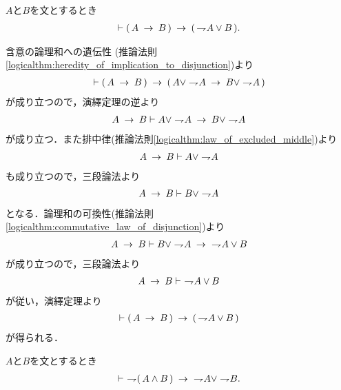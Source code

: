 	\begin{screen}
		\begin{logicalthm}[含意は否定と論理和で表せる]
		\label{logicalthm:implication_rewritable_by_disjunction_of_negation}
			$A$と$B$を文とするとき
			\begin{align}
				\vdash (\, A \rarrow B\, ) \rarrow (\, \negation A \vee B\, ).
			\end{align}
		\end{logicalthm}
	\end{screen}
	
	\begin{prf}
		含意の論理和への遺伝性
		(推論法則\ref{logicalthm:heredity_of_implication_to_disjunction})より
		\begin{align}
			\vdash (\, A \rarrow B\, ) 
			\rarrow (\, A \vee \negation A \rarrow B \vee \negation A\, )
		\end{align}
		が成り立つので，演繹定理の逆より
		\begin{align}
			A \rarrow B \vdash A \vee \negation A \rarrow B \vee \negation A
		\end{align}
		が成り立つ．また排中律(推論法則\ref{logicalthm:law_of_excluded_middle})より
		\begin{align}
			A \rarrow B \vdash A \vee \negation A
		\end{align}
		も成り立つので，三段論法より
		\begin{align}
			A \rarrow B \vdash B \vee \negation A
		\end{align}
		となる．論理和の可換性(推論法則\ref{logicalthm:commutative_law_of_disjunction})より
		\begin{align}
			A \rarrow B \vdash B \vee \negation A \rarrow\ \negation A \vee B
		\end{align}
		が成り立つので，三段論法より
		\begin{align}
			A \rarrow B \vdash\ \negation A \vee B
		\end{align}
		が従い，演繹定理より
		\begin{align}
			\vdash (\, A \rarrow B\, ) \rarrow (\, \negation A \vee B\, )
		\end{align}
		が得られる．
		\QED
	\end{prf}
	
	\begin{screen}
		\begin{logicalthm}
		\label{logicalthm:strong_De_Morgan_law_2}
			$A$と$B$を文とするとき
			\begin{align}
				\vdash\ \negation (\, A \wedge B\, )
				\rarrow\ \negation A \vee \negation B.
			\end{align}
		\end{logicalthm}
	\end{screen}
	
